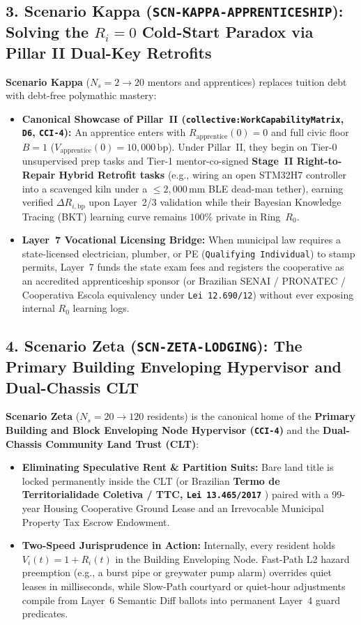 \subsection{3. Scenario Kappa (\texttt{SCN-KAPPA-APPRENTICESHIP}): Solving the $R_i = 0$ Cold-Start Paradox via Pillar II Dual-Key Retrofits}
\textbf{Scenario Kappa} ($N_s = 2 \to 20$ mentors and apprentices) replaces tuition debt with debt-free polymathic mastery:
\begin{itemize}
    \item \textbf{Canonical Showcase of Pillar~II (\texttt{collective:WorkCapabilityMatrix}, \texttt{D6}, \texttt{CCI-4}):} An apprentice enters with $R_{\mathrm{apprentice}}(0) = 0$ and full civic floor $B = 1$ ($V_{\mathrm{apprentice}}(0) = 10{,}000\,\mathrm{bp}$). Under Pillar~II, they begin on Tier-0 unsupervised prep tasks and Tier-1 mentor-co-signed \textbf{Stage~II Right-to-Repair Hybrid Retrofit tasks} (e.g., wiring an open STM32H7 controller into a scavenged kiln under a $\le 2{,}000\,\mathrm{mm}$ BLE dead-man tether), earning verified $\Delta R_{i,\mathrm{bp}}$ upon Layer~2/3 validation while their Bayesian Knowledge Tracing (BKT) learning curve remains $100\%$ private in Ring~$R_0$.
    \item \textbf{Layer~7 Vocational Licensing Bridge:} When municipal law requires a state-licensed electrician, plumber, or PE (\texttt{Qualifying Individual}) to stamp permits, Layer~7 funds the state exam fees and registers the cooperative as an accredited apprenticeship sponsor (or Brazilian SENAI / PRONATEC / Cooperativa Escola equivalency under \texttt{Lei 12.690/12}) without ever exposing internal $R_0$ learning logs.
\end{itemize}

\subsection{4. Scenario Zeta (\texttt{SCN-ZETA-LODGING}): The Primary Building Enveloping Hypervisor and Dual-Chassis CLT}
\textbf{Scenario Zeta} ($N_s = 20 \to 120$ residents) is the canonical home of the \textbf{Primary Building and Block Enveloping Node Hypervisor (\texttt{CCI-4})} and the \textbf{Dual-Chassis Community Land Trust (CLT)}:
\begin{itemize}
    \item \textbf{Eliminating Speculative Rent \& Partition Suits:} Bare land title is locked permanently inside the CLT (or Brazilian \textbf{Termo de Territorialidade Coletiva / TTC, \texttt{Lei 13.465/2017}} \parencite{brazil_ttc2017}) paired with a 99-year Housing Cooperative Ground Lease and an Irrevocable Municipal Property Tax Escrow Endowment.
    \item \textbf{Two-Speed Jurisprudence in Action:} Internally, every resident holds $V_i(t) = 1 + R_i(t)$ in the Building Enveloping Node. Fast-Path L2 hazard preemption (e.g., a burst pipe or greywater pump alarm) overrides quiet leases in milliseconds, while Slow-Path courtyard or quiet-hour adjustments compile from Layer~6 Semantic Diff ballots into permanent Layer~4 guard predicates.
\end{itemize}

